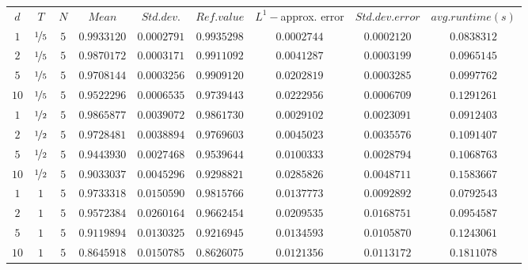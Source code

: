 \begin{tabular}{ccccccccc}
$d$ & $T$ & $N$ & $Mean$ & $Std. dev.$ & $Ref. value$ & $L^1-$approx. error & $Std. dev. error$ & $avg. runtime (s)$\\
$1$ & $\nicefrac{1}{5}$ & $5$ & $0.9933120$ & $0.0002791$ & $0.9935298$ & $0.0002744$ & $0.0002120$ & $0.0838312$\\
$2$ & $\nicefrac{1}{5}$ & $5$ & $0.9870172$ & $0.0003171$ & $0.9911092$ & $0.0041287$ & $0.0003199$ & $0.0965145$\\
$5$ & $\nicefrac{1}{5}$ & $5$ & $0.9708144$ & $0.0003256$ & $0.9909120$ & $0.0202819$ & $0.0003285$ & $0.0997762$\\
$10$ & $\nicefrac{1}{5}$ & $5$ & $0.9522296$ & $0.0006535$ & $0.9739443$ & $0.0222956$ & $0.0006709$ & $0.1291261$\\
$1$ & $\nicefrac{1}{2}$ & $5$ & $0.9865877$ & $0.0039072$ & $0.9861730$ & $0.0029102$ & $0.0023091$ & $0.0912403$\\
$2$ & $\nicefrac{1}{2}$ & $5$ & $0.9728481$ & $0.0038894$ & $0.9769603$ & $0.0045023$ & $0.0035576$ & $0.1091407$\\
$5$ & $\nicefrac{1}{2}$ & $5$ & $0.9443930$ & $0.0027468$ & $0.9539644$ & $0.0100333$ & $0.0028794$ & $0.1068763$\\
$10$ & $\nicefrac{1}{2}$ & $5$ & $0.9033037$ & $0.0045296$ & $0.9298821$ & $0.0285826$ & $0.0048711$ & $0.1583667$\\
$1$ & $1$ & $5$ & $0.9733318$ & $0.0150590$ & $0.9815766$ & $0.0137773$ & $0.0092892$ & $0.0792543$\\
$2$ & $1$ & $5$ & $0.9572384$ & $0.0260164$ & $0.9662454$ & $0.0209535$ & $0.0168751$ & $0.0954587$\\
$5$ & $1$ & $5$ & $0.9119894$ & $0.0130325$ & $0.9216945$ & $0.0134593$ & $0.0105870$ & $0.1243061$\\
$10$ & $1$ & $5$ & $0.8645918$ & $0.0150785$ & $0.8626075$ & $0.0121356$ & $0.0113172$ & $0.1811078$\\
\end{tabular}
